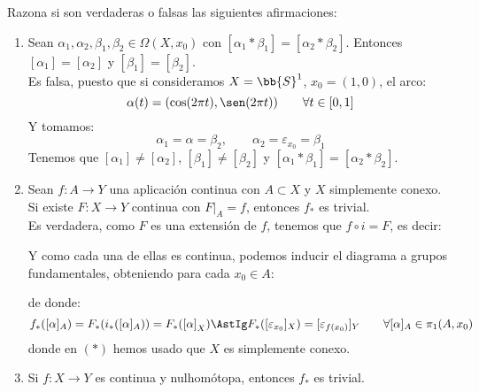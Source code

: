 \begin{ejercicio}
    Razona si son verdaderas o falsas las siguientes afirmaciones:
    \begin{enumerate}[label=\alph*)]
        \item Sean $\alpha_1,\alpha_2,\beta_1,\beta_2\in \Omega(X,x_0)$  con $[\alpha_1\ast \beta_1] = [\alpha_2\ast \beta_2]$. Entonces $[\alpha_1] = [\alpha_2]$ y $[\beta_1] = [\beta_2]$.\\

            Es falsa, puesto que si consideramos $X=\bb{S}^1$, $x_0 =(1,0)$, el arco:
            \begin{equation*}
                \alpha(t) = (\cos(2\pi t), \sen(2\pi t)) \qquad \forall t\in [0,1]
            \end{equation*}
            Y tomamos:
            \begin{equation*}
                \alpha_1 = \alpha = \beta_2, \qquad \alpha_2 = \varepsilon_{x_0} = \beta_1
            \end{equation*}
            Tenemos que $[\alpha_1] \neq [\alpha_2]$, $[\beta_1]\neq[\beta_2]$ y $[\alpha_1\ast \beta_1] = [\alpha_2\ast \beta_2]$.
        \item Sean $f:A\to Y$ una aplicación continua con $A\subset X$ y $X$ simplemente conexo. Si existe $F:X\to Y$ continua con $F\big|_A = f$, entonces $f_\ast$ es trivial.\\

            Es verdadera, como $F$ es una extensión de $f$, tenemos que $f\circ i = F$, es decir:
            \begin{figure}[H]
                \centering
            \end{figure}
            \noindent
            Y como cada una de ellas es continua, podemos inducir el diagrama a grupos fundamentales, obteniendo para cada $x_0\in A$:
            \begin{figure}[H]
                \centering
            \end{figure}
            de donde:
            \begin{equation*}
                f_\ast([\alpha]_A) = F_\ast(i_\ast([\alpha]_{A})) = F_\ast({[\alpha]}_{X}) \AstIg F_\ast([\varepsilon_{x_0}]_{X}) = [\varepsilon_{f(x_0)}]_Y \qquad \forall [\alpha]_A \in \pi_1(A,x_0)
            \end{equation*}
            donde en $(\ast)$ hemos usado que $X$ es simplemente conexo.
        \item Si $f:X\to Y$ es continua y nulhomótopa, entonces $f_\ast$ es trivial.


\end{enumerate}
\end{ejercicio}
